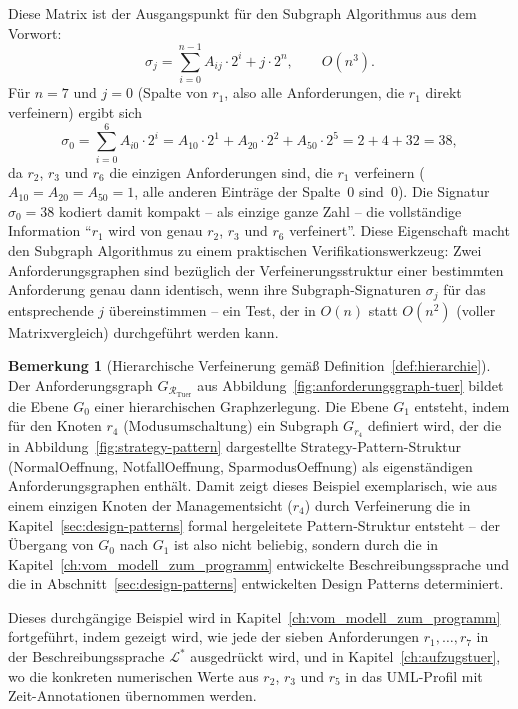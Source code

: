 ﻿\documentclass[a4paper,12pt]{report}
\theoremstyle{definition}
\newtheorem{bemerkung}{Bemerkung}[section]
\begin{document}
\noindent
Diese Matrix ist der Ausgangspunkt für den Subgraph Algorithmus aus dem
Vorwort:
\[
\sigma_j = \sum_{i=0}^{n-1} A_{ij} \cdot 2^i + j \cdot 2^n, \qquad O(n^3).
\]
Für $n = 7$ und $j = 0$ (Spalte von $r_1$, also alle Anforderungen, die
$r_1$ direkt verfeinern) ergibt sich
\[
\sigma_0 = \sum_{i=0}^{6} A_{i0} \cdot 2^i = A_{10}\cdot2^1 + A_{20}\cdot2^2
+ A_{50}\cdot2^5 = 2 + 4 + 32 = 38,
\]
da $r_2$, $r_3$ und $r_6$ die einzigen Anforderungen sind, die $r_1$
verfeinern ($A_{10}=A_{20}=A_{50}=1$, alle anderen Einträge der Spalte~$0$
sind~$0$). Die Signatur $\sigma_0 = 38$ kodiert damit kompakt -- als einzige
ganze Zahl -- die vollständige Information ``$r_1$ wird von genau $r_2$,
$r_3$ und $r_6$ verfeinert''. Diese Eigenschaft macht den
Subgraph Algorithmus zu einem praktischen Verifikationswerkzeug: Zwei
Anforderungsgraphen sind bezüglich der Verfeinerungsstruktur einer
bestimmten Anforderung genau dann identisch, wenn ihre Subgraph-Signaturen
$\sigma_j$ für das entsprechende $j$ übereinstimmen -- ein Test, der in
$O(n)$ statt $O(n^2)$ (voller Matrixvergleich) durchgeführt werden kann.

\begin{bemerkung}[Hierarchische Verfeinerung gemäß Definition~\ref{def:hierarchie}]
Der Anforderungsgraph $G_{\mathcal{R}_{\text{Tuer}}}$ aus
Abbildung~\ref{fig:anforderungsgraph-tuer} bildet die Ebene $G_0$ einer
hierarchischen Graphzerlegung. Die Ebene $G_1$ entsteht, indem für den
Knoten $r_4$ (Modusumschaltung) ein Subgraph $G_{r_4}$ definiert wird, der
die in Abbildung~\ref{fig:strategy-pattern} dargestellte
Strategy-Pattern-Struktur (NormalOeffnung, NotfallOeffnung,
SparmodusOeffnung) als eigenständigen Anforderungsgraphen enthält. Damit
zeigt dieses Beispiel exemplarisch, wie aus einem einzigen Knoten der
Managementsicht ($r_4$) durch Verfeinerung die in
Kapitel~\ref{sec:design-patterns} formal hergeleitete Pattern-Struktur
entsteht -- der Übergang von $G_0$ nach $G_1$ ist also nicht beliebig,
sondern durch die in Kapitel~\ref{ch:vom_modell_zum_programm} entwickelte
Beschreibungssprache und die in Abschnitt~\ref{sec:design-patterns}
entwickelten Design Patterns determiniert.
\end{bemerkung}

\noindent
Dieses durchgängige Beispiel wird in
Kapitel~\ref{ch:vom_modell_zum_programm} fortgeführt, indem gezeigt wird,
wie jede der sieben Anforderungen $r_1, \ldots, r_7$ in der
Beschreibungssprache $\mathcal{L}^*$ ausgedrückt wird, und in
Kapitel~\ref{ch:aufzugstuer}, wo die konkreten numerischen Werte aus $r_2$,
$r_3$ und $r_5$ in das UML-Profil mit Zeit-Annotationen übernommen werden.
\end{document}

